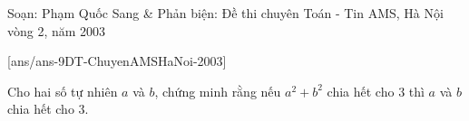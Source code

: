 \begin{name}
{Soạn: Phạm Quốc Sang \& Phản biện: }
{Đề thi chuyên Toán - Tin AMS, Hà Nội vòng 2, năm 2003}
\end{name}
\setcounter{ex}{0}
[ans/ans-9DT-ChuyenAMSHaNoi-2003]

\begin{ex}%
	Cho hai số tự nhiên $a$ và $b$, chứng minh rằng nếu $a^2 + b^2$ chia hết cho $3$ thì $a$ và $b$ chia hết cho $3$.
\end{ex}	

